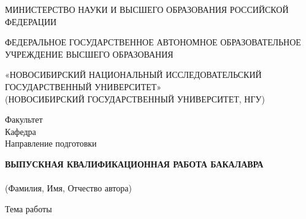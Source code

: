 \documentclass[14pt,a4paper]{extarticle}
\author{}
\date{}
\numberwithin{table}{section}
\numberwithin{figure}{section}
\numberwithin{equation}{section}
\begin{document}
\thispagestyle{empty}
{\singlespacing
\begin{center}
МИНИСТЕРСТВО НАУКИ И ВЫСШЕГО ОБРАЗОВАНИЯ РОССИЙСКОЙ ФЕДЕРАЦИИ

ФЕДЕРАЛЬНОЕ ГОСУДАРСТВЕННОЕ АВТОНОМНОЕ ОБРАЗОВАТЕЛЬНОЕ\\
УЧРЕЖДЕНИЕ ВЫСШЕГО ОБРАЗОВАНИЯ

«НОВОСИБИРСКИЙ НАЦИОНАЛЬНЫЙ ИССЛЕДОВАТЕЛЬСКИЙ\\
ГОСУДАРСТВЕННЫЙ УНИВЕРСИТЕТ»\\
(НОВОСИБИРСКИЙ ГОСУДАРСТВЕННЫЙ УНИВЕРСИТЕТ, НГУ)
\end{center}

\vspace{1.5em}

\noindent Факультет \underline{}\\[0.6em]
Кафедра \underline{}\\[0.6em]
Направление подготовки \underline{}

\vspace{2.5em}

\begin{center}
\textbf{ВЫПУСКНАЯ КВАЛИФИКАЦИОННАЯ РАБОТА БАКАЛАВРА}\\[0.4em]
\underline{}\\
{\small (Фамилия, Имя, Отчество автора)}
\end{center}

\vspace{0.8em}

\noindent Тема работы \underline{}\\[0.6em]
\underline{}\\[0.6em]
\underline{}

\vspace{2em}

}
\end{document}

